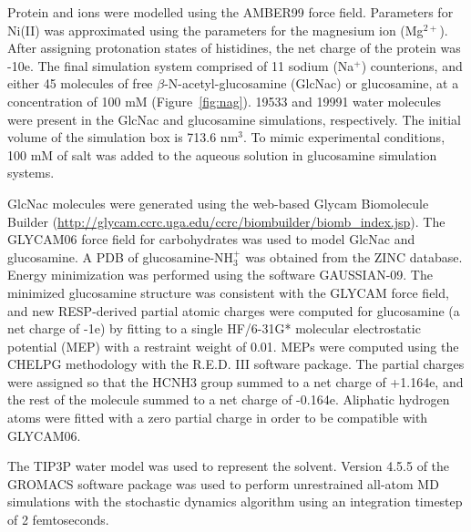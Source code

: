 Protein and ions were modelled using the AMBER99 force field.\cite{Cornell:1995td} Parameters for Ni(II) was approximated using the parameters for the magnesium ion (Mg$^{2+}$). After assigning protonation states of histidines, the net charge of the protein was -10e. The final simulation system comprised of 11 sodium (Na$^{+}$) counterions, and either 45 molecules of free $\beta$-N-acetyl-glucosamine (GlcNac) or glucosamine, at a concentration of 100 mM (Figure~\ref{fig:nag}). 19533 and 19991 water molecules were present in the GlcNac and glucosamine simulations, respectively. The initial volume of the simulation box is 713.6 nm$^{3}$.  To mimic experimental conditions, 100 mM of salt was added to the aqueous solution in glucosamine simulation systems.

GlcNac molecules were generated using the web-based Glycam Biomolecule Builder (\url{http://glycam.ccrc.uga.edu/ccrc/biombuilder/biomb_index.jsp}). The GLYCAM06 force field for carbohydrates\cite{Kirschner:2008ii} was used to model GlcNac and glucosamine. A PDB of glucosamine-$\textrm{NH}_{3}^{+}$ was obtained from the ZINC database.\cite{Irwin:2005kx} Energy minimization was performed using the software GAUSSIAN-09.\cite{g09} The minimized glucosamine structure was consistent with the GLYCAM force field, and new RESP-derived partial atomic charges were computed for glucosamine (a net charge of -1e) by fitting to a single HF/6-31G* molecular electrostatic potential (MEP) with a restraint weight of 0.01. MEPs were computed using the CHELPG methodology\cite{Breneman:1990ue} with the R.E.D. III software package.\cite{Dupradeau:2010bb} The partial charges were assigned so that the HCNH3 group summed to a net charge of +1.164e, and the rest of the molecule summed to a net charge of -0.164e. Aliphatic hydrogen atoms were fitted with a zero partial charge in order to be compatible with GLYCAM06.


The TIP3P water model was used to represent the solvent. Version 4.5.5 of the GROMACS software package\cite{Pronk:2013ef,Hess:2008p5353} was used to perform unrestrained all-atom MD simulations with the stochastic dynamics algorithm using an integration timestep of 2 femtoseconds.

